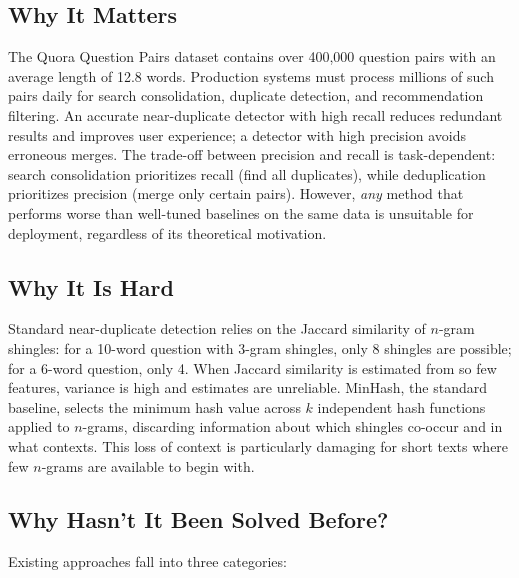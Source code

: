 \documentclass[11pt,letterpaper]{article}
\begin{document}
\subsection{Why It Matters}

The Quora Question Pairs dataset contains over 400,000 question pairs with an average length of 12.8 words. Production systems must process millions of such pairs daily for search consolidation, duplicate detection, and recommendation filtering. An accurate near-duplicate detector with high recall reduces redundant results and improves user experience; a detector with high precision avoids erroneous merges. The trade-off between precision and recall is task-dependent: search consolidation prioritizes recall (find all duplicates), while deduplication prioritizes precision (merge only certain pairs). However, \emph{any} method that performs worse than well-tuned baselines on the same data is unsuitable for deployment, regardless of its theoretical motivation.

\subsection{Why It Is Hard}

Standard near-duplicate detection relies on the Jaccard similarity of $n$-gram shingles: for a 10-word question with 3-gram shingles, only 8 shingles are possible; for a 6-word question, only 4. When Jaccard similarity is estimated from so few features, variance is high and estimates are unreliable. MinHash, the standard baseline, selects the minimum hash value across $k$ independent hash functions applied to $n$-grams, discarding information about which shingles co-occur and in what contexts. This loss of context is particularly damaging for short texts where few $n$-grams are available to begin with.

\subsection{Why Hasn't It Been Solved Before?}

Existing approaches fall into three categories:
\end{document}

